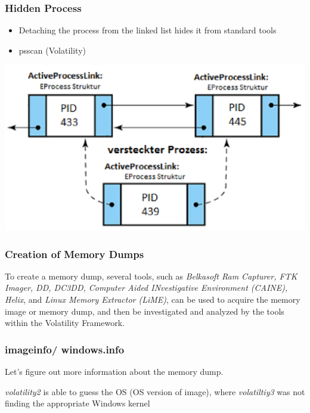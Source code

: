 \subsubsection{Hidden Process}
\begin{itemize}
    \item Detaching the process from the linked list hides it from standard tools
    \item psscan (Volatility)
\end{itemize}
\begin{center}
    \includegraphics[width=1.0\linewidth]{./img/13-volatility/hidden_process}
    \vspace{-8pt}
\end{center}


\subsubsection{Creation of Memory Dumps}
To create a memory dump, several tools, such as \textit{Belkasoft Ram Capturer, FTK Imager, DD, DC3DD, Computer Aided INvestigative Environment (CAINE), Helix}, and \textit{Linux Memory Extractor (LiME)}, can be used to acquire the memory image or memory dump, and then be investigated and analyzed by the tools within the Volatility Framework.

\columnbreak

\subsubsection{imageinfo/ windows.info}
Let's figure out more information about the memory dump.

\textit{volatility2} is able to guess the OS (OS version of image), where \textit{volatiltiy3} was not finding the appropriate Windows kernel

